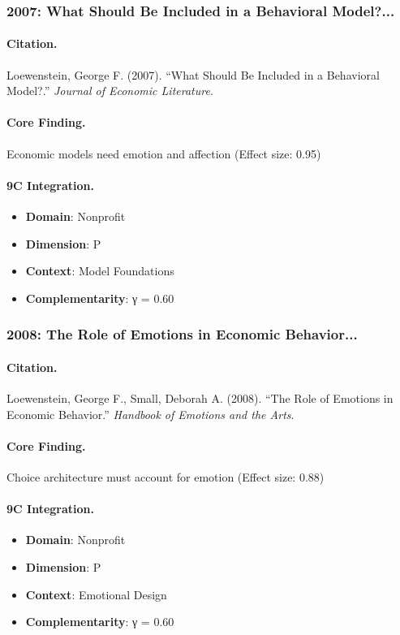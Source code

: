\subsubsection{2007: What Should Be Included in a Behavioral Model?...}

\paragraph{Citation.}
Loewenstein, George F. (2007). ``What Should Be Included in a Behavioral Model?.''
\textit{Journal of Economic Literature}.

\paragraph{Core Finding.}
Economic models need emotion and affection (Effect size: 0.95)

\paragraph{9C Integration.}
\begin{itemize}[nosep]
  \item \textbf{Domain}: Nonprofit
  \item \textbf{Dimension}: P
  \item \textbf{Context}: Model Foundations
  \item \textbf{Complementarity}: γ = 0.60
\end{itemize}

\subsubsection{2008: The Role of Emotions in Economic Behavior...}

\paragraph{Citation.}
Loewenstein, George F., Small, Deborah A. (2008). ``The Role of Emotions in Economic Behavior.''
\textit{Handbook of Emotions and the Arts}.

\paragraph{Core Finding.}
Choice architecture must account for emotion (Effect size: 0.88)

\paragraph{9C Integration.}
\begin{itemize}[nosep]
  \item \textbf{Domain}: Nonprofit
  \item \textbf{Dimension}: P
  \item \textbf{Context}: Emotional Design
  \item \textbf{Complementarity}: γ = 0.60
\end{itemize}

